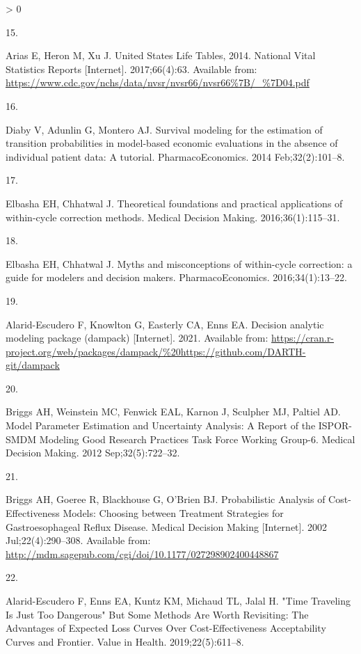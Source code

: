 \documentclass[
]{article}
\newlength{\cslhangindent}
\newlength{\csllabelwidth}
\newenvironment{CSLReferences}[2] %
 {%
  \setlength{\parindent}{0pt}
  \ifodd #1 \everypar{\setlength{\hangindent}{\cslhangindent}}\ignorespaces\fi
  \ifnum #2 > 0
  \setlength{\parskip}{#2\baselineskip}
  \fi
 }%
 {}
\newcommand{\CSLLeftMargin}[1]{\parbox[t]{\csllabelwidth}{#1}}
\newcommand{\CSLRightInline}[1]{\parbox[t]{\linewidth - \csllabelwidth}{#1}\break}
\begin{document}
\begin{CSLReferences}{0}{0}
\leavevmode\hypertarget{ref-Arias2017}{}%
\CSLLeftMargin{15. }
\CSLRightInline{Arias E, Heron M, Xu J. {United States Life Tables, 2014}. National Vital Statistics Reports {[}Internet{]}. 2017;66(4):63. Available from: \url{https://www.cdc.gov/nchs/data/nvsr/nvsr66/nvsr66\%7B/_\%7D04.pdf}}

\leavevmode\hypertarget{ref-Diaby2014}{}%
\CSLLeftMargin{16. }
\CSLRightInline{Diaby V, Adunlin G, Montero AJ. {Survival modeling for the estimation of transition probabilities in model-based economic evaluations in the absence of individual patient data: A tutorial}. PharmacoEconomics. 2014 Feb;32(2):101--8. }

\leavevmode\hypertarget{ref-Elbasha2016}{}%
\CSLLeftMargin{17. }
\CSLRightInline{Elbasha EH, Chhatwal J. {Theoretical foundations and practical applications of within-cycle correction methods}. Medical Decision Making. 2016;36(1):115--31. }

\leavevmode\hypertarget{ref-Elbasha2016a}{}%
\CSLLeftMargin{18. }
\CSLRightInline{Elbasha EH, Chhatwal J. {Myths and misconceptions of within-cycle correction: a guide for modelers and decision makers}. PharmacoEconomics. 2016;34(1):13--22. }

\leavevmode\hypertarget{ref-Alarid-Escudero2021}{}%
\CSLLeftMargin{19. }
\CSLRightInline{Alarid-Escudero F, Knowlton G, Easterly CA, Enns EA. Decision analytic modeling package (dampack) {[}Internet{]}. 2021. Available from: \url{https://cran.r-project.org/web/packages/dampack/\%20https://github.com/DARTH-git/dampack}}

\leavevmode\hypertarget{ref-Briggs2012}{}%
\CSLLeftMargin{20. }
\CSLRightInline{Briggs AH, Weinstein MC, Fenwick EAL, Karnon J, Sculpher MJ, Paltiel AD. {Model Parameter Estimation and Uncertainty Analysis: A Report of the ISPOR-SMDM Modeling Good Research Practices Task Force Working Group-6.} Medical Decision Making. 2012 Sep;32(5):722--32. }

\leavevmode\hypertarget{ref-Briggs2002}{}%
\CSLLeftMargin{21. }
\CSLRightInline{Briggs AH, Goeree R, Blackhouse G, O'Brien BJ. {Probabilistic Analysis of Cost-Effectiveness Models: Choosing between Treatment Strategies for Gastroesophageal Reflux Disease}. Medical Decision Making {[}Internet{]}. 2002 Jul;22(4):290--308. Available from: \url{http://mdm.sagepub.com/cgi/doi/10.1177/027298902400448867}}

\leavevmode\hypertarget{ref-Alarid-Escudero2019}{}%
\CSLLeftMargin{22. }
\CSLRightInline{Alarid-Escudero F, Enns EA, Kuntz KM, Michaud TL, Jalal H. {"Time Traveling Is Just Too Dangerous" But Some Methods Are Worth Revisiting: The Advantages of Expected Loss Curves Over Cost-Effectiveness Acceptability Curves and Frontier}. Value in Health. 2019;22(5):611--8. }


\end{CSLReferences}
\end{document}
